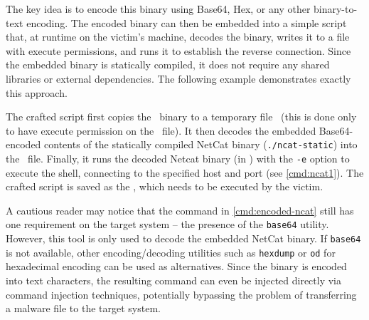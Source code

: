 The key idea is to encode this binary using Base64, Hex, or any other binary-to-text encoding. The encoded binary can then be embedded into a simple script that, at runtime on the victim's machine, decodes the binary, writes it to a file with execute permissions, and runs it to establish the reverse connection. Since the embedded binary is statically compiled, it does not require any shared libraries or external dependencies.
The following example demonstrates exactly this approach.


The crafted script first copies the \shell\ binary to a temporary file \tmp\ (this is done only to have execute permission on the \tmp\ file). It then decodes the embedded Base64-encoded contents of the statically compiled NetCat binary (\texttt{./ncat-static}) into the \tmp\ file. Finally, it runs the decoded Netcat binary (in \tmp) with the \texttt{-e} option to execute the shell, connecting to the specified host and port (see \cref{cmd:ncat1}). The crafted script is saved as the \script, which needs to be executed by the victim.

A cautious reader may notice that the command in \cref{cmd:encoded-ncat} still has one requirement on the target system -- the presence of the \texttt{base64} utility. However, this tool is only used to decode the embedded NetCat binary. If \texttt{base64} is not available, other encoding/decoding utilities such as \texttt{hexdump} or \texttt{od} for hexadecimal encoding can be used as alternatives. Since the binary is encoded into text characters, the resulting command can even be injected directly via command injection techniques, potentially bypassing the problem of transferring a malware file to the target system.
